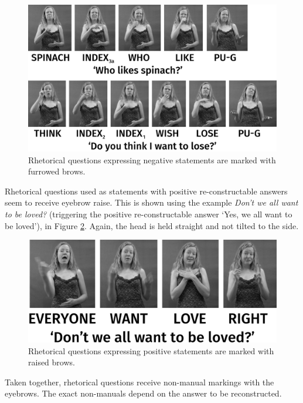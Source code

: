 \begin{figure}[bt]
\centering
	\includegraphics[width=1.0\textwidth]{rhetoricalsw.jpg}
	\caption{Rhetorical questions expressing negative statements are marked with furrowed brows.}
	\label{rhetorical}
\end{figure}
Rhetorical questions used as statements with positive re-constructable answers seem to receive eyebrow raise. This is shown using the example \textit{Don't we all want to be loved?} (triggering the positive re-constructable answer `Yes, we all want to be loved'), in Figure \ref{rhetlove}. Again, the head is held straight and not tilted to the side. 

\begin{figure}[bt]
\centering
	\includegraphics[width=1.0\textwidth]{rhetlovesw.jpg}
	\caption{Rhetorical questions expressing positive statements are marked with raised brows.}
	\label{rhetlove}
\end{figure}

Taken together, rhetorical questions receive non-manual markings with the eyebrows. The exact non-manuals depend on the answer to be reconstructed. 


